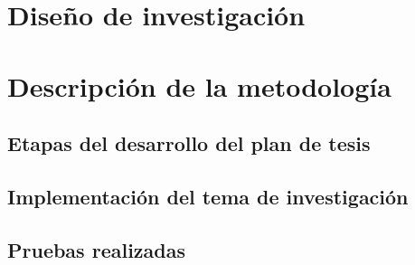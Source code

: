 
\section{Diseño de investigación}

\section{Descripción de la metodología}
\ifmodoplan
\subsection{Etapas del desarrollo del plan de tesis}
\else
\subsection{Implementación del tema de investigación}
\subsection{Pruebas realizadas}
\fi

